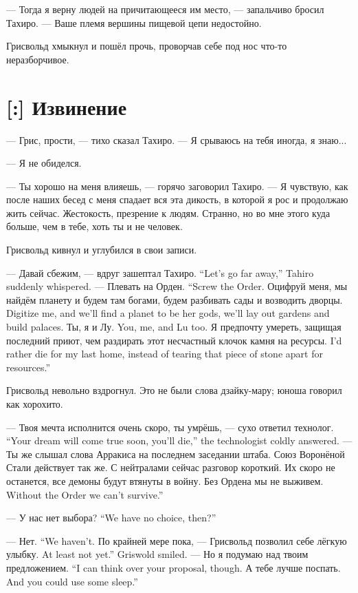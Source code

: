 --- Тогда я верну людей на причитающееся им место, --- запальчиво бросил Тахиро.
--- Ваше племя вершины пищевой цепи недостойно.

Грисвольд хмыкнул и пошёл прочь, проворчав себе под нос что-то неразборчивое.

\section{[:] Извинение}

\textspace

--- Грис, прости, --- тихо сказал Тахиро.
--- Я срываюсь на тебя иногда, я знаю...

--- Я не обиделся.

--- Ты хорошо на меня влияешь, --- горячо заговорил Тахиро.
--- Я чувствую, как после наших бесед с меня спадает вся эта дикость, в которой я рос и продолжаю жить сейчас.
Жестокость, презрение к людям.
Странно, но во мне этого куда больше, чем в тебе, хоть ты и не человек.

Грисвольд кивнул и углубился в свои записи.

{--- Давай сбежим, --- вдруг зашептал Тахиро.}
{``Let's go far away,'' Tahiro suddenly whispered.}
{--- Плевать на Орден.}
{``Screw the Order.}
{Оцифруй меня, мы найдём планету и будем там богами, будем разбивать сады и возводить дворцы.}
{Digitize me, and we'll find a planet to be her gods, we'll lay out gardens and build palaces.}
{Ты, я и Лу.}
{You, me, and Lu too.}
{Я предпочту умереть, защищая последний приют, чем раздирать этот несчастный клочок камня на ресурсы.}
{I'd rather die for my last home, instead of tearing that piece of stone apart for resources.''}

Грисвольд невольно вздрогнул.
Это не были слова дзайку-мару;
юноша говорил как хорохито.

{--- Твоя мечта исполнится очень скоро, ты умрёшь, --- сухо ответил технолог.}
{``Your dream will come true soon, you'll die,'' the technologist coldly answered.}
--- Ты же слышал слова Арракиса на последнем заседании штаба.
Союз Воронёной Стали действует так же.
С нейтралами сейчас разговор короткий.
Их скоро не останется, все демоны будут втянуты в войну.
{Без Ордена мы не выживем.}
{Without the Order we can't survive.''}

{--- У нас нет выбора?}
{``We have no choice, then?''}

{--- Нет.}
{``We haven't.}
{По крайней мере пока, --- Грисвольд позволил себе лёгкую улыбку.}
{At least not yet.'' Griswold smiled.}
{--- Но я подумаю над твоим предложением.}
{``I can think over your proposal, though.}
{А тебе лучше поспать.}
{And you could use some sleep.''}

